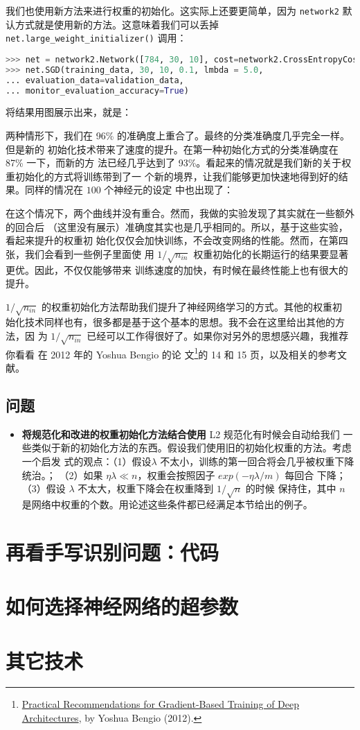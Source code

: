 我们也使用新方法来进行权重的初始化。这实际上还要更简单，因为 \lstinline!network2! 默认方式就是使用新的方法。这意味着我们可以丢掉 \lstinline!net.large_weight_initializer()! 调用：

\begin{lstlisting}[language=Python]
>>> net = network2.Network([784, 30, 10], cost=network2.CrossEntropyCost)
>>> net.SGD(training_data, 30, 10, 0.1, lmbda = 5.0,
... evaluation_data=validation_data,
... monitor_evaluation_accuracy=True)
\end{lstlisting}

将结果用图展示出来，就是：

两种情形下，我们在 96\% 的准确度上重合了。最终的分类准确度几乎完全一样。但是新的
初始化技术带来了速度的提升。在第一种初始化方式的分类准确度在 87\% 一下，而新的方
法已经几乎达到了 93\%。看起来的情况就是我们新的关于权重初始化的方式将训练带到了一
个新的境界，让我们能够更加快速地得到好的结果。同样的情况在 $100$ 个神经元的设定
中也出现了：

在这个情况下，两个曲线并没有重合。然而，我做的实验发现了其实就在一些额外的回合后
（这里没有展示）准确度其实也是几乎相同的。所以，基于这些实验，看起来提升的权重初
始化仅仅会加快训练，不会改变网络的性能。然而，在第四张，我们会看到一些例子里面使
用 $1/\sqrt{n_{in}}$ 权重初始化的长期运行的结果要显著更优。因此，不仅仅能够带来
训练速度的加快，有时候在最终性能上也有很大的提升。

$1/\sqrt{n_{in}}$ 的权重初始化方法帮助我们提升了神经网络学习的方式。其他的权重初
始化技术同样也有，很多都是基于这个基本的思想。我不会在这里给出其他的方法，因
为 $1/\sqrt{n_{in}}$ 已经可以工作得很好了。如果你对另外的思想感兴趣，我推荐你看看
在 2012 年的 Yoshua Bengio 的论
文\footnote{\href{http://arxiv.org/pdf/1206.5533v2.pdf}{Practical
    Recommendations for Gradient-Based Training of Deep Architectures}, by
  Yoshua Bengio (2012).  }的 14 和 15 页，以及相关的参考文献。

\subsection*{问题}

\begin{itemize}
\item \textbf{将规范化和改进的权重初始化方法结合使用} L2 规范化有时候会自动给我们
  一些类似于新的初始化方法的东西。假设我们使用旧的初始化权重的方法。考虑一个启发
  式的观点：（1）假设$\lambda$ 不太小，训练的第一回合将会几乎被权重下降统治。；
  （2）如果 $\eta\lambda \ll n$，权重会按照因子 $exp(-\eta\lambda/m)$ 每回合
  下降；（3）假设 $\lambda$ 不太大，权重下降会在权重降到 $1/\sqrt{n}$ 的时候
  保持住，其中 $n$ 是网络中权重的个数。用论述这些条件都已经满足本节给出的例子。
\end{itemize}

\section{再看手写识别问题：代码}
\label{sec:handwriting_recognition_revisited_the_code}

\section{如何选择神经网络的超参数}
\label{sec:how_to_choose_a_neural_network's_hyper-parameters}

\section{其它技术}
\label{sec:other_techniques}
